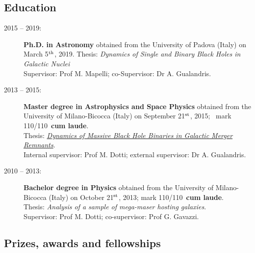 \subsection*{Education}
\begin{description}
    \item[2015 – 2019:] {\bf Ph.D. in Astronomy} obtained from the University of Padova (Italy) on March 5$^{\rm th}$, 2019. 
    Thesis: \textit{Dynamics of Single and Binary Black Holes in Galactic Nuclei}\\
    Supervisor: Prof M. Mapelli; co-Supervisor: Dr A. Gualandris. 
    
    \item[2013 – 2015:] {\bf Master degree in Astrophysics and Space Physics} obtained from the University of Milano-Bicocca (Italy) on September 21$^{\rm st}$, 2015; \ mark 110/110~{\bf cum laude}. \\
    Thesis: \textit{ \href{https://drive.google.com/file/d/0Bx7KflRPRjKbZTRkc19yeXdLc1E/view?usp=sharing}{Dynamics of Massive Black Hole Binaries in Galactic Merger Remnants}}.\\
    Internal supervisor: Prof M. Dotti; external supervisor: Dr A. Gualandris.
    
    \item[2010 – 2013:] {\bf Bachelor degree in Physics} obtained from the University of Milano-Bicocca (Italy) on October 21$^{\rm st}$, 2013; mark 110/110~{\bf cum laude}.\\
    Thesis: \textit{Analysis of a sample of mega-maser hosting galaxies}.\\ Supervisor: Prof M. Dotti; co-supervisor: Prof G. Gavazzi.

\end{description}

\subsection*{Prizes, awards and fellowships}

